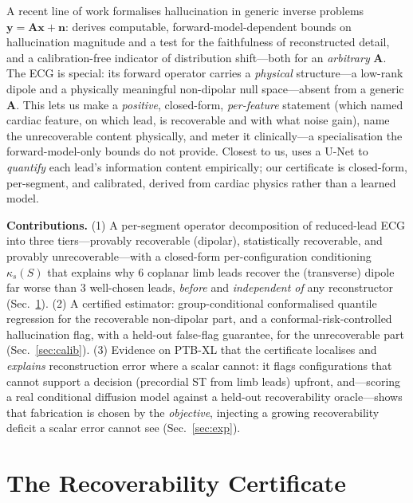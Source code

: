 \documentclass{article}
\begin{document}
A recent line of work formalises hallucination in generic inverse problems
$\bm y=\bm A\bm x+\bm n$: \cite{gottschling2026hallucinations} derives computable,
forward-model-dependent bounds on hallucination magnitude and a test for the
faithfulness of reconstructed detail, and \cite{kim2025distshift} a calibration-free
indicator of distribution shift---both for an \emph{arbitrary} $\bm A$. The ECG is
special: its forward operator carries a \emph{physical} structure---a low-rank dipole
and a physically meaningful non-dipolar null space---absent from a generic $\bm A$.
This lets us make a \emph{positive}, closed-form, \emph{per-feature} statement (which
named cardiac feature, on which lead, is recoverable and with what noise gain), name
the unrecoverable content physically, and meter it clinically---a specialisation the
forward-model-only bounds do not provide. Closest to us,
\cite{gradowski2025reveals} uses a U-Net to \emph{quantify} each lead's information
content empirically; our certificate is closed-form, per-segment, and calibrated,
derived from cardiac physics rather than a learned model.

\noindent\textbf{Contributions.} (1) A per-segment operator decomposition of
reduced-lead ECG into three tiers---provably recoverable (dipolar), statistically
recoverable, and provably unrecoverable---with a closed-form per-configuration
conditioning $\kappa_s(S)$ that explains why $6$ coplanar limb leads recover the
(transverse) dipole far worse than $3$ well-chosen leads, \emph{before} and
\emph{independent of} any reconstructor (Sec.~\ref{sec:cert}). (2) A certified
estimator: group-conditional conformalised quantile regression for the recoverable
non-dipolar part, and a conformal-risk-controlled hallucination flag, with a held-out
false-flag guarantee, for the unrecoverable part (Sec.~\ref{sec:calib}). (3) Evidence
on PTB-XL that the certificate localises and \emph{explains} reconstruction error
where a scalar cannot: it flags configurations that cannot support a decision
(precordial ST from limb leads) upfront, and---scoring a real conditional diffusion
model against a held-out recoverability oracle---shows that fabrication is chosen by
the \emph{objective}, injecting a growing recoverability deficit a scalar error
cannot see (Sec.~\ref{sec:exp}).

\section{The Recoverability Certificate}
\label{sec:cert}
\end{document}
